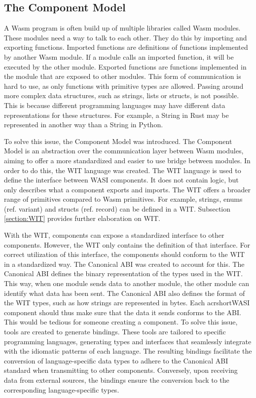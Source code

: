 \subsection{The Component Model}
\label{section:thecomponentmodel}

A \acrshort{Wasm} program is often build up of multiple libraries called Wasm modules. These modules need a way to talk to each other. They do this by importing and exporting functions. Imported functions are definitions of functions implemented by another Wasm module. If a module calls an imported function, it will be executed by the other module. Exported functions are functions implemented in the module that are exposed to other modules. 
This form of communication is hard to use, as only functions with primitive types are allowed. Passing around more complex data structures, such as strings, lists or structs, is not possible. This is because different programming languages may have different data representations for these structures. For example, a String in Rust may be represented in another way than a String in Python.

To solve this issue, the Component Model was introduced. The Component Model is an abstraction over the communication layer between Wasm modules, aiming to offer a more standardized and easier to use bridge between modules. In order to do this, the \acrfull{WIT} language was created. The \acrshort{WIT} language is used to define the interface between \acrshort{WASI} components. It does not contain logic, but only describes what a component exports and imports. The \acrshort{WIT} offers a broader range of primitives compared to \acrshort{Wasm} primitives. For example, strings, enums (ref. variant) and structs (ref. record) can be defined in a \acrshort{WIT}. Subsection \ref{section:WIT} provides further elaboration on WIT.

With the \acrshort{WIT}, components can expose a standardized interface to other components. However, the \acrshort{WIT} only contains the definition of that interface. For correct utilization of this interface, the components should conform to the \acrshort{WIT} in a standardized way. The Canonical \acrshort{ABI} was created to account for this. The Canonical \acrshort{ABI} defines the binary representation of the types used in the \acrshort{WIT}. This way, when one module sends data to another module, the other module can identify what data has been sent. The Canonical \acrshort{ABI} also defines the format of the \acrshort{WIT} types, such as how strings are represented in bytes. Each acrshort{WASI} component should thus make sure that the data it sends conforms to the ABI. This would be tedious for someone creating a component. To solve this issue, tools are created to generate bindings. These tools are tailored to specific programming languages, generating types and interfaces that seamlessly integrate with the idiomatic patterns of each language. The resulting bindings facilitate the conversion of language-specific data types to adhere to the Canonical ABI standard when transmitting to other components. Conversely, upon receiving data from external sources, the bindings ensure the conversion back to the corresponding language-specific types.

